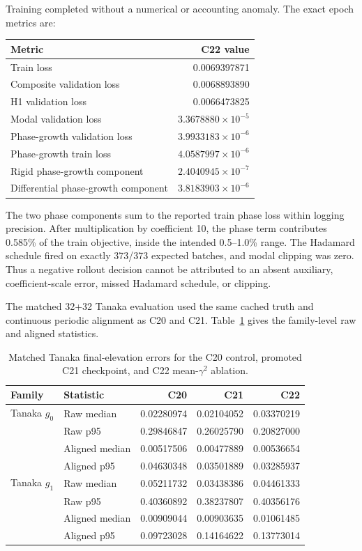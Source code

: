 \documentclass[11pt]{article}
\begin{document}
Training completed without a numerical or accounting anomaly.  The exact
epoch metrics are:
\begin{center}
\begin{tabular}{lr}
\toprule
Metric & C22 value \\
\midrule
Train loss & 0.0069397871 \\
Composite validation loss & 0.0068893890 \\
H1 validation loss & 0.0066473825 \\
Modal validation loss & $3.3678880\times10^{-5}$ \\
Phase-growth validation loss & $3.9933183\times10^{-6}$ \\
Phase-growth train loss & $4.0587997\times10^{-6}$ \\
Rigid phase-growth component & $2.4040945\times10^{-7}$ \\
Differential phase-growth component & $3.8183903\times10^{-6}$ \\
\bottomrule
\end{tabular}
\end{center}
The two phase components sum to the reported train phase loss within logging
precision.  After multiplication by coefficient 10, the phase term contributes
0.585\% of the train objective, inside the intended 0.5--1.0\% range.  The
Hadamard schedule fired on exactly 373/373 expected batches, and modal clipping
was zero.  Thus a negative rollout decision cannot be attributed to an absent
auxiliary, coefficient-scale error, missed Hadamard schedule, or clipping.

The matched 32+32 Tanaka evaluation used the same cached truth and continuous
periodic alignment as C20 and C21.  Table~\ref{tab:c20-c22-tanaka} gives the
family-level raw and aligned statistics.

\begin{table}[htbp]
\centering
\small
\begin{tabular}{llrrr}
\toprule
Family & Statistic & C20 & C21 & C22 \\
\midrule
Tanaka $g_0$ & Raw median     & 0.02280974 & 0.02104052 & 0.03370219 \\
             & Raw p95        & 0.29846847 & 0.26025790 & 0.20827000 \\
             & Aligned median & 0.00517506 & 0.00477889 & 0.00536654 \\
             & Aligned p95    & 0.04630348 & 0.03501889 & 0.03285937 \\
\addlinespace
Tanaka $g_1$ & Raw median     & 0.05211732 & 0.03438386 & 0.04461333 \\
             & Raw p95        & 0.40360892 & 0.38237807 & 0.40356176 \\
             & Aligned median & 0.00909044 & 0.00903635 & 0.01061485 \\
             & Aligned p95    & 0.09723028 & 0.14164622 & 0.13773014 \\
\bottomrule
\end{tabular}
\caption{Matched Tanaka final-elevation errors for the C20 control, promoted
C21 checkpoint, and C22 mean-\(\gamma^2\) ablation.}
\label{tab:c20-c22-tanaka}
\end{table}
\end{document}
